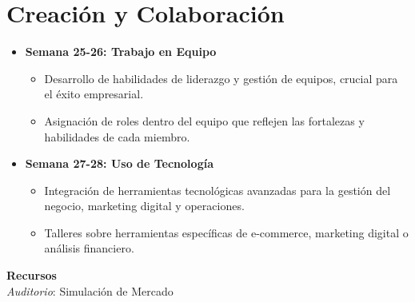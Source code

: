 \newpage
\section{Creación y Colaboración}
\begin{itemize}
  \item \textbf{Semana 25-26: Trabajo en Equipo}
  \begin{itemize}
    \item Desarrollo de habilidades de liderazgo y gestión de equipos, crucial para el éxito empresarial.
    \item Asignación de roles dentro del equipo que reflejen las fortalezas y habilidades de cada miembro.
  \end{itemize}
  \item \textbf{Semana 27-28: Uso de Tecnología}
  \begin{itemize}
    \item Integración de herramientas tecnológicas avanzadas para la gestión del negocio, marketing digital y operaciones.
    \item Talleres sobre herramientas específicas de e-commerce, marketing digital o análisis financiero.
  \end{itemize}
\end{itemize}
{\large \textbf{Recursos}}\\
\textit{Auditorio}: Simulación de Mercado

